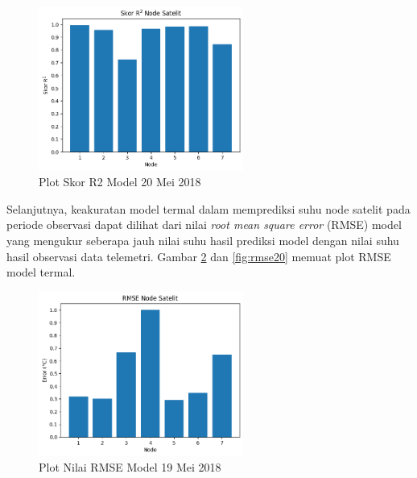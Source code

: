 \begin{figure}[H]
\setlength{}
\begin{center}
\includegraphics[width=0.6\textwidth]{fig/r2_2018-05-20.png}
\caption{Plot Skor R2 Model 20 Mei 2018}
\label{fig:r220}
\end{center}
\end{figure}

Selanjutnya, keakuratan model termal dalam memprediksi suhu node satelit pada
periode observasi dapat dilihat dari nilai \textit{root mean square error} (RMSE)
model yang mengukur seberapa jauh nilai suhu hasil prediksi model dengan nilai
suhu hasil observasi data telemetri. Gambar \ref{fig:rmse19} dan
\ref{fig:rmse20} memuat plot RMSE model termal. 

\begin{figure}[H]
\setlength{}
\begin{center}
\includegraphics[width=0.6\textwidth]{fig/rmse_2018-05-19.png}
\caption{Plot Nilai RMSE Model 19 Mei 2018}
\label{fig:rmse19}
\end{center}
\end{figure}

